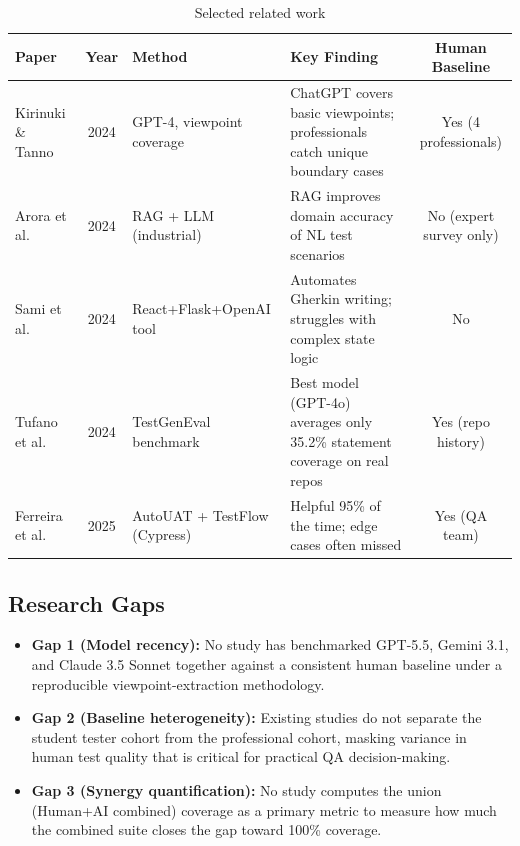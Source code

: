 \documentclass[12pt,a4paper]{article}
\begin{document}
\begin{table}[H]
\centering
\caption{Selected related work}
\label{tab:literature}
\small
\begin{tabularx}{\textwidth}{p{2.6cm} c p{2.6cm} p{4.0cm} c}
\toprule
\textbf{Paper} & \textbf{Year} & \textbf{Method} & \textbf{Key Finding} & \textbf{Human Baseline} \\
\midrule
Kirinuki \& Tanno~\cite{b1} & 2024 & GPT-4, viewpoint coverage & ChatGPT covers basic viewpoints; professionals catch unique boundary cases & Yes (4 professionals) \\
Arora et al.~\cite{b2} & 2024 & RAG + LLM (industrial) & RAG improves domain accuracy of NL test scenarios & No (expert survey only) \\
Sami et al.~\cite{b3} & 2024 & React+Flask+OpenAI tool & Automates Gherkin writing; struggles with complex state logic & No \\
Tufano et al.~\cite{b4} & 2024 & TestGenEval benchmark & Best model (GPT-4o) averages only 35.2\% statement coverage on real repos & Yes (repo history) \\
Ferreira et al.~\cite{b5} & 2025 & AutoUAT + TestFlow (Cypress) & Helpful 95\% of the time; edge cases often missed & Yes (QA team) \\
\bottomrule
\end{tabularx}
\end{table}

\subsection*{Research Gaps}
\begin{itemize}[leftmargin=1.2cm]
    \item \textbf{Gap 1 (Model recency):} No study has benchmarked GPT-5.5, Gemini 3.1, and Claude 3.5 Sonnet together against a consistent human baseline under a reproducible viewpoint-extraction methodology.
    \item \textbf{Gap 2 (Baseline heterogeneity):} Existing studies do not separate the student tester cohort from the professional cohort, masking variance in human test quality that is critical for practical QA decision-making.
    \item \textbf{Gap 3 (Synergy quantification):} No study computes the union (Human+AI combined) coverage as a primary metric to measure how much the combined suite closes the gap toward 100\% coverage.
\end{itemize}

\end{document}
